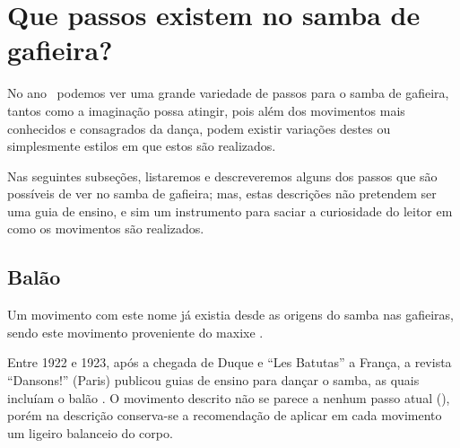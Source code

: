 
\section{Que passos existem no samba de gafieira?}

No ano \AnoLivro~podemos ver uma grande variedade de passos para o samba de gafieira,
tantos como a imaginação possa atingir, pois além dos movimentos mais conhecidos e  consagrados da dança,
podem existir variações  destes ou simplesmente estilos em que estos são realizados. 

Nas seguintes subseções, listaremos e descreveremos 
alguns dos passos que são possíveis de ver no samba de gafieira;
mas, estas descrições não pretendem ser uma guia de ensino,
e sim um instrumento para saciar a curiosidade do leitor em como os movimentos são realizados.\\

\subsection{Balão} 
\label{def:PassoBalao}
Um movimento com este nome já existia desde as origens do samba nas gafieiras, 
sendo este movimento proveniente do maxixe \cite[pp. 142]{perna2002samba} 
\cite[pp. 93]{efege1974maxixe} \cite[pp. 465]{marcondes1977enciclopedia}.

Entre 1922 e 1923, após a chegada de Duque e ``Les Batutas'' a França, 
a revista ``Dansons!'' (Paris) publicou guias de ensino para dançar o samba, %
as quais incluíam o balão \cite[pp. 3]{Dansons:12} \cite[pp. 7]{Dansons:25}.
O movimento descrito não se parece a nenhum passo atual (\AnoLivro), 
porém na descrição conserva-se a recomendação de aplicar em cada movimento um ligeiro balanceio do corpo. 

